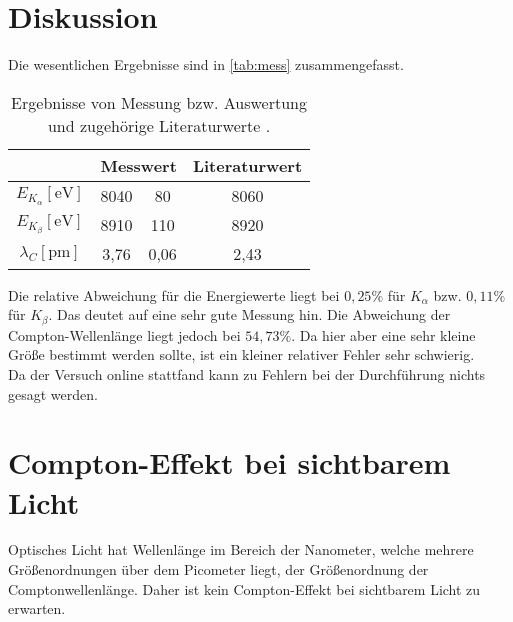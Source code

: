 \section{Diskussion}
\label{sec:Diskussion}
Die wesentlichen Ergebnisse sind in \autoref{tab:mess} zusammengefasst.
\begin{table}
	\centering
	\begin{tabular}{c c @{${}\pm{}$} c c}
		\toprule
	& \multicolumn{2}{c}{Messwert} 
	& Literaturwert \\
	\midrule
		$E_{K_\alpha} [\text{eV}]$ & 8040 & 80 & 8060\\
		$E_{K_\beta} [\text{eV}]$ & 8910 & 110 & 8920\\
		$\lambda_{C} [\text{pm}]$ & 3,76 & 0,06 & 2,43\\
		\bottomrule
	\end{tabular}
	\caption{Ergebnisse von Messung bzw. Auswertung und zugehörige Literaturwerte
	\cite{ld-didactic.de} \cite{nist}.}
	\label{tab:mess}
\end{table}
Die relative Abweichung für die Energiewerte liegt bei $0,25\%$ für $K_\alpha$ 
bzw. $0,11\%$ für $K_\beta$. Das deutet auf eine sehr gute Messung hin. Die Abweichung der
Compton-Wellenlänge liegt jedoch bei $54,73\%$. Da hier aber eine sehr kleine Größe
bestimmt werden sollte, ist ein kleiner relativer Fehler sehr schwierig.
\\
Da der Versuch online stattfand kann zu Fehlern bei der Durchführung nichts gesagt werden.

\section{Compton-Effekt bei sichtbarem Licht}
\label{sec:Compton-Effekt bei sichtbarem Licht}
Optisches Licht hat Wellenlänge im Bereich der Nanometer, welche mehrere Größenordnungen
über dem Picometer liegt, der Größenordnung der Comptonwellenlänge. Daher ist kein
Compton-Effekt bei sichtbarem Licht zu erwarten.

